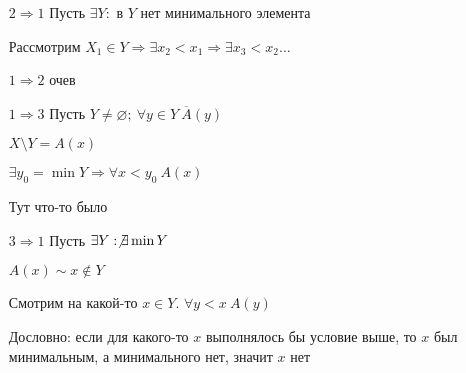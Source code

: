 \documentclass[12pt]{article}
\begin{document}
\begin{itemize}
    \item[$2 \Rightarrow 1$] Пусть $\exists Y :$ в $Y$ нет минимального элемента
    
    Рассмотрим $X_1 \in Y \Rightarrow \exists x_2 < x_1 \Rightarrow \exists x_3 < x_2 \ldots$

    \item[$1 \Rightarrow 2$] очев 
    
    \item[$1 \Rightarrow 3$] Пусть $Y \neq \varnothing;\ \forall y \in Y\ \overline{A}(y)$
    
    $X \setminus Y = A(x)$

    $\exists y_0 = \min Y \Rightarrow \forall x < y_0\ A(x)$

    Тут что-то было

    \item[$3 \Rightarrow 1$] Пусть $\exists Y : \not\exists \min Y$
    
    $A(x) \sim x \notin Y$

    Смотрим на какой-то $x \in Y$. $\forall y < x\ A(y)$

    Дословно: если для какого-то $x$ выполнялось бы условие выше, то $x$ был минимальным, а минимального нет, значит $x$ нет
\end{itemize}
\end{document}
